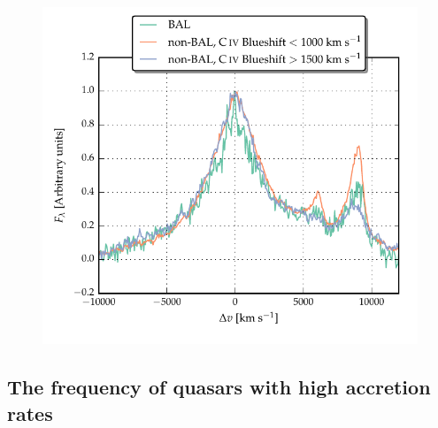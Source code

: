 \begin{figure}
    \centering
    \includegraphics[width=0.8\linewidth]{figures/chapter03/bal_composite.pdf}
    \caption[{}]{}
    \label{fig:bal_composite}
\end{figure}

\subsection{The frequency of quasars with high accretion rates}

